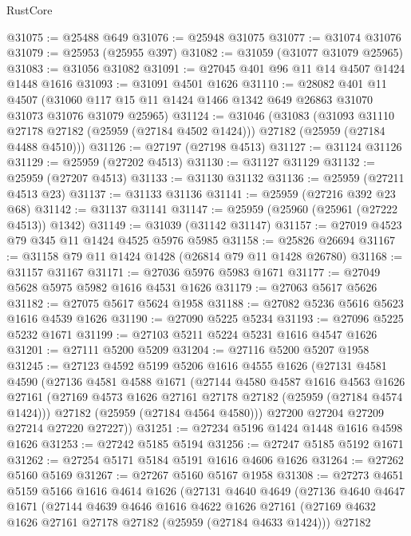 \begin{lexlean}{RustCore}
\begin{coremodule}
@31075 := @25488 @649
@31076 := @25948 @31075
@31077 := @31074 @31076
@31079 := @25953 (@25955 @397)
@31082 := @31059 (@31077 @31079 @25965)
@31083 := @31056 @31082
@31091 := @27045 @401 @96 @11 @14 @4507 @1424 @1448 @1616
@31093 := @31091 @4501 @1626
@31110 := @28082
    @401
    @11
    @4507
    (@31060 @117 @15 @11 @1424 @1466 @1342 @649 @26863 @31070 @31073 @31076 @31079 @25965)
@31124 := @31046
    (@31083
      (@31093 @31110 @27178 @27182 (@25959 (@27184 @4502 @1424)))
      @27182
      (@25959 (@27184 @4488 @4510)))
@31126 := @27197 (@27198 @4513)
@31127 := @31124 @31126
@31129 := @25959 (@27202 @4513)
@31130 := @31127 @31129
@31132 := @25959 (@27207 @4513)
@31133 := @31130 @31132
@31136 := @25959 (@27211 @4513 @23)
@31137 := @31133 @31136
@31141 := @25959 (@27216 @392 @23 @68)
@31142 := @31137 @31141
@31147 := @25959 (@25960 (@25961 (@27222 @4513)) @1342)
@31149 := @31039 (@31142 @31147)
@31157 := @27019 @4523 @79 @345 @11 @1424 @4525 @5976 @5985
@31158 := @25826 @26694
@31167 := @31158 @79 @11 @1424 @1428 (@26814 @79 @11 @1428 @26780)
@31168 := @31157 @31167
@31171 := @27036 @5976 @5983 @1671
@31177 := @27049 @5628 @5975 @5982 @1616 @4531 @1626
@31179 := @27063 @5617 @5626
@31182 := @27075 @5617 @5624 @1958
@31188 := @27082 @5236 @5616 @5623 @1616 @4539 @1626
@31190 := @27090 @5225 @5234
@31193 := @27096 @5225 @5232 @1671
@31199 := @27103 @5211 @5224 @5231 @1616 @4547 @1626
@31201 := @27111 @5200 @5209
@31204 := @27116 @5200 @5207 @1958
@31245 := @27123
    @4592
    @5199
    @5206
    @1616
    @4555
    @1626
    (@27131
      @4581
      @4590
      (@27136
        @4581
        @4588
        @1671
        (@27144
          @4580
          @4587
          @1616
          @4563
          @1626
          @27161
          (@27169 @4573 @1626 @27161 @27178 @27182 (@25959 (@27184 @4574 @1424)))
          @27182
          (@25959 (@27184 @4564 @4580)))
        @27200
        @27204
        @27209
        @27214
        @27220
        @27227))
@31251 := @27234 @5196 @1424 @1448 @1616 @4598 @1626
@31253 := @27242 @5185 @5194
@31256 := @27247 @5185 @5192 @1671
@31262 := @27254 @5171 @5184 @5191 @1616 @4606 @1626
@31264 := @27262 @5160 @5169
@31267 := @27267 @5160 @5167 @1958
@31308 := @27273
    @4651
    @5159
    @5166
    @1616
    @4614
    @1626
    (@27131
      @4640
      @4649
      (@27136
        @4640
        @4647
        @1671
        (@27144
          @4639
          @4646
          @1616
          @4622
          @1626
          @27161
          (@27169 @4632 @1626 @27161 @27178 @27182 (@25959 (@27184 @4633 @1424)))
          @27182

\end{coremodule}
\end{lexlean}
